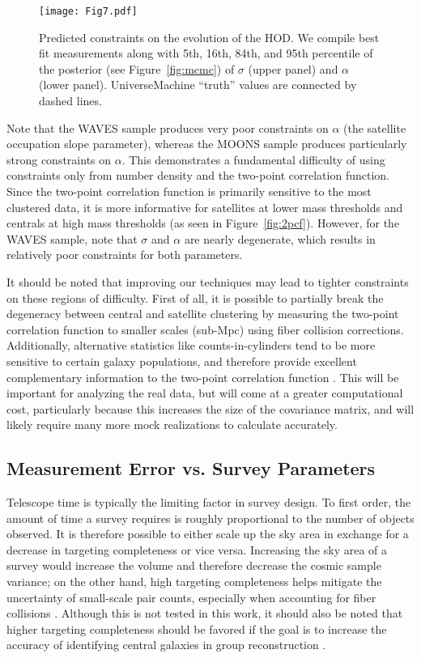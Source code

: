 \documentclass[twocolumn,twocolappendix]{aastex63}
\begin{document}
\begin{figure}[ht!]
\texttt{[image: Fig7.pdf]}
\caption{Predicted constraints on the evolution of the HOD. We compile best fit measurements along with 5th, 16th, 84th, and 95th percentile of the posterior (see Figure~\ref{fig:mcmc}) of $\sigma$ (upper panel) and $\alpha$ (lower panel). UniverseMachine ``truth'' values are connected by dashed lines.
\label{fig:hod-vs-sample}}
\end{figure}

Note that the WAVES sample produces very poor constraints on $\alpha$ (the satellite occupation slope parameter), whereas the MOONS sample produces particularly strong constraints on $\alpha$. This demonstrates a fundamental difficulty of using constraints only from number density and the two-point correlation function. Since the two-point correlation function is primarily sensitive to the most clustered data, it is more informative for satellites at lower mass thresholds and centrals at high mass thresholds (as seen in Figure~\ref{fig:2pcf}). However, for the WAVES sample, note that $\sigma$ and $\alpha$ are nearly degenerate, which results in relatively poor constraints for both parameters.

It should be noted that improving our techniques may lead to tighter constraints on these regions of difficulty. First of all, it is possible to partially break the degeneracy between central and satellite clustering by measuring the two-point correlation function to smaller scales (sub-Mpc) using fiber collision corrections. Additionally, alternative statistics like counts-in-cylinders tend to be more sensitive to certain galaxy populations, and therefore provide excellent complementary information to the two-point correlation function \citep{Wang:2019}.
This will be important for analyzing the real data, but will come at a greater computational cost, particularly because this increases the size of the covariance matrix, and will likely require many more mock realizations to calculate accurately.

\subsection{Measurement Error vs. Survey Parameters}

Telescope time is typically the limiting factor in survey design. To first order, the amount of time a survey requires is roughly proportional to the number of objects observed. It is therefore possible to either scale up the sky area in exchange for a decrease in {targeting} completeness or vice versa. Increasing the sky area of a survey would increase the volume and therefore decrease the cosmic sample variance; on the other hand, high {targeting} completeness helps mitigate the uncertainty of small-scale pair counts, especially when accounting for fiber collisions \citep{Bianchi:Percival:2017}. Although this is not tested in this work, it should also be noted that higher {targeting} completeness should be favored if the goal is to increase the accuracy of identifying central galaxies in group reconstruction \citep{Looser:2021}.
\end{document}
